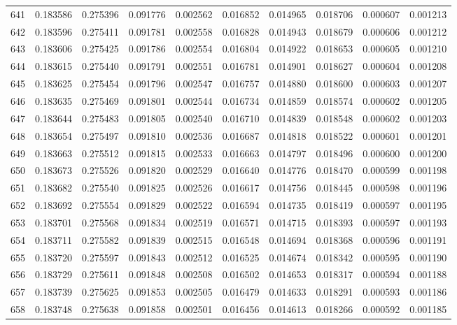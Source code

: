 \begin{tabular}{lrrrrrrrrr}
641 & 0.183586 & 0.275396 & 0.091776 & 0.002562 & 0.016852 & 0.014965 & 0.018706 & 0.000607 & 0.001213 \\
642 & 0.183596 & 0.275411 & 0.091781 & 0.002558 & 0.016828 & 0.014943 & 0.018679 & 0.000606 & 0.001212 \\
643 & 0.183606 & 0.275425 & 0.091786 & 0.002554 & 0.016804 & 0.014922 & 0.018653 & 0.000605 & 0.001210 \\
644 & 0.183615 & 0.275440 & 0.091791 & 0.002551 & 0.016781 & 0.014901 & 0.018627 & 0.000604 & 0.001208 \\
645 & 0.183625 & 0.275454 & 0.091796 & 0.002547 & 0.016757 & 0.014880 & 0.018600 & 0.000603 & 0.001207 \\
646 & 0.183635 & 0.275469 & 0.091801 & 0.002544 & 0.016734 & 0.014859 & 0.018574 & 0.000602 & 0.001205 \\
647 & 0.183644 & 0.275483 & 0.091805 & 0.002540 & 0.016710 & 0.014839 & 0.018548 & 0.000602 & 0.001203 \\
648 & 0.183654 & 0.275497 & 0.091810 & 0.002536 & 0.016687 & 0.014818 & 0.018522 & 0.000601 & 0.001201 \\
649 & 0.183663 & 0.275512 & 0.091815 & 0.002533 & 0.016663 & 0.014797 & 0.018496 & 0.000600 & 0.001200 \\
650 & 0.183673 & 0.275526 & 0.091820 & 0.002529 & 0.016640 & 0.014776 & 0.018470 & 0.000599 & 0.001198 \\
651 & 0.183682 & 0.275540 & 0.091825 & 0.002526 & 0.016617 & 0.014756 & 0.018445 & 0.000598 & 0.001196 \\
652 & 0.183692 & 0.275554 & 0.091829 & 0.002522 & 0.016594 & 0.014735 & 0.018419 & 0.000597 & 0.001195 \\
653 & 0.183701 & 0.275568 & 0.091834 & 0.002519 & 0.016571 & 0.014715 & 0.018393 & 0.000597 & 0.001193 \\
654 & 0.183711 & 0.275582 & 0.091839 & 0.002515 & 0.016548 & 0.014694 & 0.018368 & 0.000596 & 0.001191 \\
655 & 0.183720 & 0.275597 & 0.091843 & 0.002512 & 0.016525 & 0.014674 & 0.018342 & 0.000595 & 0.001190 \\
656 & 0.183729 & 0.275611 & 0.091848 & 0.002508 & 0.016502 & 0.014653 & 0.018317 & 0.000594 & 0.001188 \\
657 & 0.183739 & 0.275625 & 0.091853 & 0.002505 & 0.016479 & 0.014633 & 0.018291 & 0.000593 & 0.001186 \\
658 & 0.183748 & 0.275638 & 0.091858 & 0.002501 & 0.016456 & 0.014613 & 0.018266 & 0.000592 & 0.001185 \\

\end{tabular}
